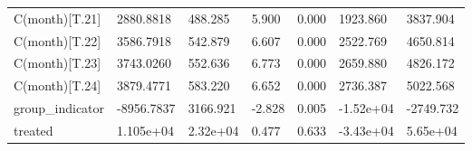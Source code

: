 \begin{tabular}{lllllll}
C(month)[T.21] &  2880.8818 &   488.285 &     5.900 &  0.000 &  1923.860 &  3837.904 \\
C(month)[T.22] &  3586.7918 &   542.879 &     6.607 &  0.000 &  2522.769 &  4650.814 \\
C(month)[T.23] &  3743.0260 &   552.636 &     6.773 &  0.000 &  2659.880 &  4826.172 \\
C(month)[T.24] &  3879.4771 &   583.220 &     6.652 &  0.000 &  2736.387 &  5022.568 \\
group_indicator & -8956.7837 &  3166.921 &    -2.828 &  0.005 & -1.52e+04 & -2749.732 \\
treated &  1.105e+04 &  2.32e+04 &     0.477 &  0.633 & -3.43e+04 &  5.65e+04 \\
\bottomrule
\end{tabular}
